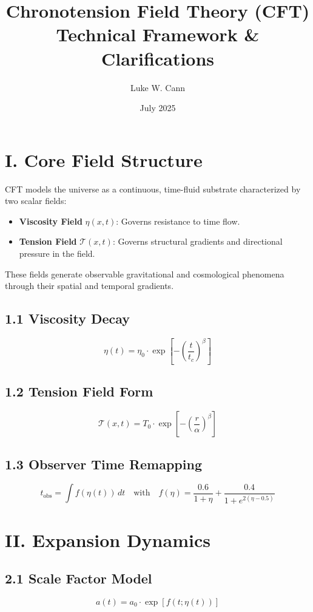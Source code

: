 \documentclass[12pt]{article}
\title{Chronotension Field Theory (CFT)\\Technical Framework \& Clarifications}
\author{Luke W. Cann}
\date{July 2025}
\begin{document}
\maketitle

\section*{I. Core Field Structure}

CFT models the universe as a continuous, time-fluid substrate characterized by two scalar fields:

\begin{itemize}
  \item \textbf{Viscosity Field} \( \eta(x, t) \): Governs resistance to time flow.
  \item \textbf{Tension Field} \( \mathcal{T}(x, t) \): Governs structural gradients and directional pressure in the field.
\end{itemize}

These fields generate observable gravitational and cosmological phenomena through their spatial and temporal gradients.

\subsection*{1.1 Viscosity Decay}
\[
\eta(t) = \eta_0 \cdot \exp\left[ -\left( \frac{t}{t_c} \right)^\beta \right]
\]

\subsection*{1.2 Tension Field Form}
\[
\mathcal{T}(x, t) = T_0 \cdot \exp\left[ -\left( \frac{r}{\alpha} \right)^\beta \right]
\]

\subsection*{1.3 Observer Time Remapping}
\[
t_{\text{obs}} = \int f(\eta(t)) \, dt \quad \text{with} \quad f(\eta) = \frac{0.6}{1 + \eta} + \frac{0.4}{1 + e^{2(\eta - 0.5)}}
\]

\section*{II. Expansion Dynamics}

\subsection*{2.1 Scale Factor Model}
\[
a(t) = a_0 \cdot \exp\left[ f(t; \eta(t)) \right]
\]
\end{document}
